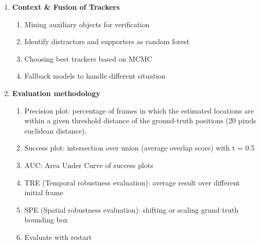 \begin{enumerate}
    \item
      \textbf{Context
      \&
      Fusion
      of
      Trackers}
      \begin{enumerate}
        \item
          Mining
          auxiliary
          objects
          for
          verification
          \cite{yang2009context}
        \item
          Identify
          distractors
          and
          supporters
          as
          random
          forest
          \cite{dinh2011context}
        \item
          Choosing
          best
          trackers
          based
          on
          MCMC
          \cite{kwon2011tracking}
        \item
          Fallback
          models
          to
          handle
          different
          situation
          \cite{santner2010prost}
      \end{enumerate}

    \item
      \textbf{Evaluation
      methodology}
      \begin{enumerate}
        \item
          Precision
          plot:
          percentage
          of
          frames
          in
          which
          the
          estimated
          locations
          are
          within
          a
          given
          threshold
          distance
          of
          the
          ground-truth
          positions
          (20
          pixels
          euclidean
          distance).
        \item
          Success
          plot:
          intersection
          over
          union
          (average
          overlap
          score)
          with
          t
          =
          0.5
        \item
          AUC:
          Area
          Under
          Curve
          of
          success
          plots
        \item
          TRE
          (Temporal
          robustness
          evaluation):
          average
          result
          over
          different
          initial
          frame
        \item
          SPE
          (Spatial
          robustness
          evaluation):
          shifting
          or
          scaling
          grund
          truth
          bounding
          box
        \item
          Evaluate
          with
          restart
      \end{enumerate}


\end{enumerate}
